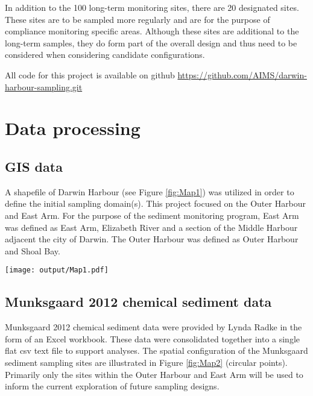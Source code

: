 \documentclass[a4paper]{article}
\let\origfigure=\figure
\let\endorigfigure=\endfigure
\renewenvironment{figure}[1][]{%
   \origfigure[H]
}{%
   \endorigfigure
}
\begin{document}
In addition to the 100 long-term monitoring sites, there are 20
designated sites. These sites are to be sampled more regularly and are
for the purpose of compliance monitoring specific areas. Although these
sites are additional to the long-term samples, they do form part of the
overall design and thus need to be considered when considering candidate
configurations.

All code for this project is available on github
\url{https://github.com/AIMS/darwin-harbour-sampling.git}

\hypertarget{data-processing}{%
\section{Data processing}\label{data-processing}}

\hypertarget{gis-data}{%
\subsection{GIS data}\label{gis-data}}

A shapefile of Darwin Harbour (see Figure \ref{fig:Map1}) was utilized
in order to define the initial sampling domain(s). This project focused
on the Outer Harbour and East Arm. For the purpose of the sediment
monitoring program, East Arm was defined as East Arm, Elizabeth River
and a section of the Middle Harbour adjacent the city of Darwin. The
Outer Harbour was defined as Outer Harbour and Shoal Bay.

\begin{figure}
\centering\scriptsize
\texttt{[image: output/Map1.pdf]}
\caption{Map of Darwin Harbour highlighting the Outer Harbour and East
Arm sections.\label{fig:Map1}}
\end{figure}

\hypertarget{munksgaard-2012-chemical-sediment-data}{%
\subsection{Munksgaard 2012 chemical sediment
data}\label{munksgaard-2012-chemical-sediment-data}}

Munksgaard 2012 chemical sediment data were provided by Lynda Radke in
the form of an Excel workbook. These data were consolidated together
into a single flat csv text file to support analyses. The spatial
configuration of the Munksgaard sediment sampling sites are illustrated
in Figure \ref{fig:Map2} (circular points). Primarily only the sites
within the Outer Harbour and East Arm will be used to inform the current
exploration of future sampling designs.
\end{document}
